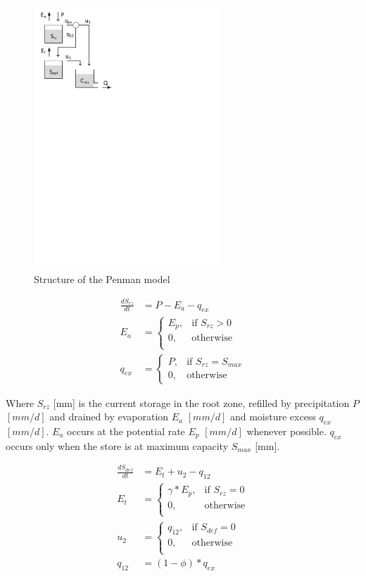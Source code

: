 { 																	%
\begin{figure}
\includegraphics[trim=1cm 20cm 7cm 1cm,width=7cm,keepaspectratio]{./AppA_files/17_schematic.pdf}
\caption{Structure of the Penman model} \label{fig:17_schematic}
\end{figure}

\begin{align}
	\frac{dS_{rz}}{dt} &= P-E_a-q_{ex} \\
	E_a &= \begin{cases}
		E_p, &\text{if } S_{rz} > 0 \\
		0, & \text{otherwise} \\
	\end{cases} \\
	q_{ex} &= 
	\begin{cases}
		P, & \text{if } S_{rz} = S_{max} \\
		0, & \text{otherwise}
	\end{cases}
\end{align}

Where $S_{rz}$ [mm] is the current storage in the root zone, refilled by precipitation $P$ $[mm/d]$ and drained by evaporation $E_a$  $[mm/d]$ and moisture excess $q_{ex}$  $[mm/d]$. $E_a$ occurs at the potential rate $E_p$  $[mm/d]$ whenever possible. $q_{ex}$ occurs only when the store is at maximum capacity $S_{max}$ [mm].

} %

\begin{align}
	\frac{dS_{def}}{dt} &= E_t+u_2-q_{12}\\
	E_t &= \begin{cases}
		\gamma*E_p, &\text{if } S_{rz} = 0 \\
		0, &\text{otherwise} \\
	\end{cases} \\
	u_2 &= \begin{cases}
		q_{12}, &\text{if } S_{def} = 0\\
		0, &\text{otherwise}\\
	\end{cases}	\\
	q_{12} &= (1-\phi)*q_{ex}
\end{align}

